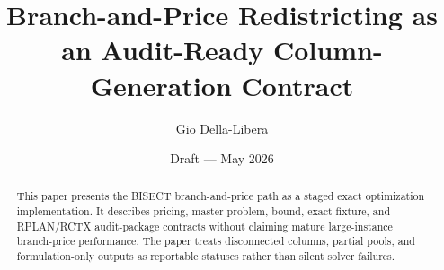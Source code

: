 \documentclass[12pt]{article}
\title{Branch-and-Price Redistricting as an Audit-Ready Column-Generation Contract}
\author{Gio Della-Libera}
\date{Draft --- May 2026}
\begin{document}
\maketitle

\begin{abstract}
This paper presents the BISECT branch-and-price path as a staged exact
optimization implementation. It describes pricing, master-problem, bound, exact
fixture, and RPLAN/RCTX audit-package contracts without claiming mature
large-instance branch-price performance. The paper treats disconnected columns,
partial pools, and formulation-only outputs as reportable statuses rather than
silent solver failures.
\end{abstract}








\nocite{bisect-u17-plan}


\end{document}
